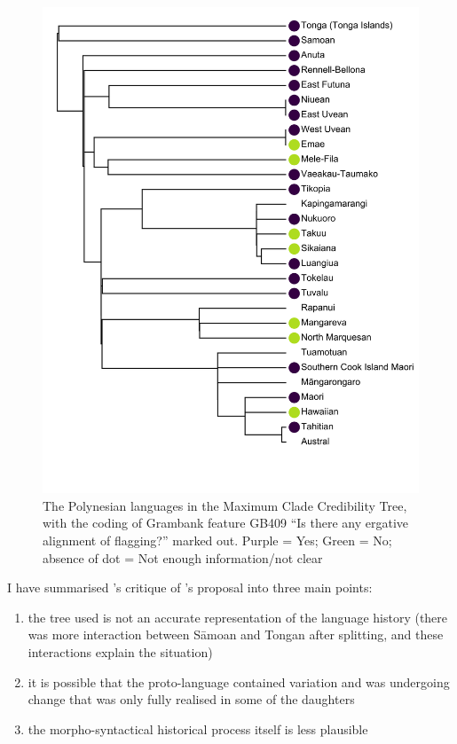 \documentclass[12pt,letterpaper]{article}
\begin{document}
\begin{figure}[p]
\centering
\includegraphics[width=16cm]{illustrations/plots_from_R//tree_plots/poly_tree_example.png}
\caption{{The Polynesian languages in the \citet{grayetal_2009} Maximum Clade Credibility Tree, with the coding of Grambank feature GB409 ``Is there any ergative alignment of flagging?'' marked out. Purple = Yes; Green = No; absence of dot = Not enough information/not clear}}
\label{poly_GB409_tree}
\end{figure} 

I have summarised \citeauthor{chung1978}'s critique of \citeauthor{clark1973aspects}'s proposal into three main points:
 
\begin{enumerate}[label=(\alph*)]
\item the tree used is not an accurate representation of the language history (there was more interaction between S\={a}moan and Tongan after splitting, and these interactions explain the situation)
\item it is possible that the proto-language contained variation and was undergoing change that was only fully realised in some of the daughters
\item the morpho-syntactical historical process itself is less plausible
\end{enumerate}
\end{document}
